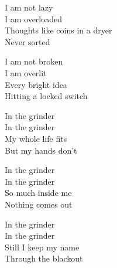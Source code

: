 \begin{lyrics}
I am not lazy\\
I am overloaded\\
Thoughts like coins in a dryer\\
Never sorted

I am not broken\\
I am overlit\\
Every bright idea\\
Hitting a locked switch

In the grinder\\
In the grinder\\
My whole life fits\\
But my hands don't

In the grinder\\
In the grinder\\
So much inside me\\
Nothing comes out

In the grinder\\
In the grinder\\
Still I keep my name\\
Through the blackout
\end{lyrics}

